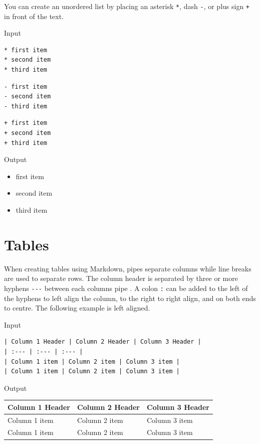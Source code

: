 \documentclass[
]{book}
\newcounter{none} %
\providecommand{\tightlist}{%
  \setlength{\itemsep}{0pt}\setlength{\parskip}{0pt}}
\begin{document}
You can create an unordered list by placing an asterisk \texttt{*}, dash \texttt{-}, or plus sign \texttt{+} in front of the text.

Input

\begin{verbatim}
* first item
* second item
* third item 
\end{verbatim}

\begin{verbatim}
- first item
- second item
- third item
\end{verbatim}

\begin{verbatim}
+ first item
+ second item
+ third item 
\end{verbatim}

Output

\begin{itemize}
\tightlist
\item
  first item
\item
  second item
\item
  third item
\end{itemize}

\section{Tables}\label{tables-1}

When creating tables using Markdown, pipes \texttt{\textbar{}} separate columns while line breaks are used to separate rows. The column header is separated by three or more hyphens \texttt{-\/-\/-} between each column\textquotesingle s pipe \texttt{\textbar{}}. A colon \texttt{:} can be added to the left of the hyphens to left align the column, to the right to right align, and on both ends to centre. The following example is left aligned.

Input

\begin{verbatim}
| Column 1 Header | Column 2 Header | Column 3 Header |
| :--- | :--- | :--- |
| Column 1 item | Column 2 item | Column 3 item |
| Column 1 item | Column 2 item | Column 3 item |
\end{verbatim}

Output

{\def\LTcaptype{none} %
\begin{longtable}[]{@{}lll@{}}
\toprule\noalign{}
Column 1 Header & Column 2 Header & Column 3 Header \\
\midrule\noalign{}
\endhead
\bottomrule\noalign{}
\endlastfoot
Column 1 item & Column 2 item & Column 3 item \\
Column 1 item & Column 2 item & Column 3 item \\
\end{longtable}
}
\end{document}
